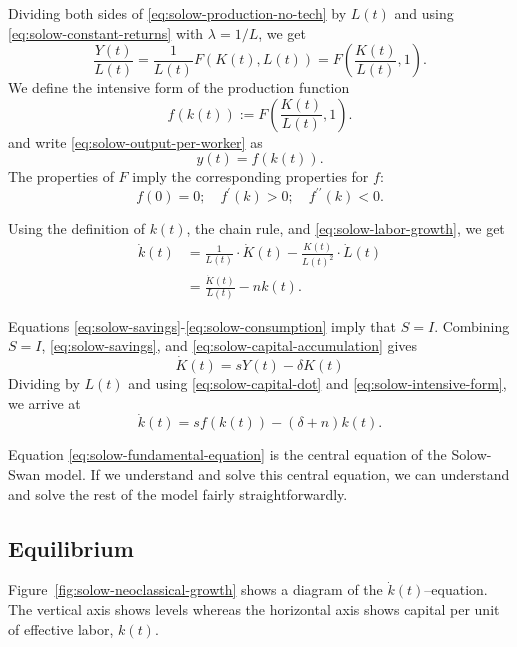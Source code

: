 \documentclass[\topdir/lecture\_notes.tex]{subfiles}
\begin{document}
Dividing both sides of \eqref{eq:solow-production-no-tech} by $L(t)$ and using \eqref{eq:solow-constant-returns} with $\lambda = 1/L$, we get
\begin{equation}
  \frac{Y(t)}{L(t)} = \frac{1}{L(t)} F(K(t), L(t)) = F \left(\frac{K(t)}{L(t)}, 1\right). \label{eq:solow-output-per-worker}
\end{equation}
We define the intensive form of the production function
\begin{equation}
  f(k(t)) := F \left(\frac{K(t)}{L(t)}, 1\right). \label{eq:solow-intensive-production}
\end{equation}
and write \eqref{eq:solow-output-per-worker} as
\begin{equation}
  y(t) = f(k(t)). \label{eq:solow-intensive-form}
\end{equation}
The properties of $F$ imply the corresponding properties for $f$:
\begin{equation}
  f(0)=0 ; \quad f^{\prime}(k)>0 ; \quad f^{\prime \prime}(k)<0.
\end{equation}

Using the definition of $k(t)$, the chain rule, and \eqref{eq:solow-labor-growth}, we get
\begin{align}
\dot{k}(t) & = \frac{1}{L(t)} \cdot \dot{K}(t)-\frac{K(t)}{L(t)^{2}} \cdot \dot{L}(t) \\
           & =\frac{\dot{K}(t)}{L(t)}-n k(t).
           \label{eq:solow-k-dot-derivation}
\end{align}

Equations \eqref{eq:solow-savings}-\eqref{eq:solow-consumption} imply that $S=I$.
Combining $S=I$, \eqref{eq:solow-savings}, and \eqref{eq:solow-capital-accumulation} gives
\begin{equation}
  \dot{K}(t)=s Y(t)-\delta K(t) \label{eq:solow-capital-dot}
\end{equation}
Dividing by $L(t)$ and using \eqref{eq:solow-capital-dot} and \eqref{eq:solow-intensive-form}, we arrive at
\begin{equation}
  \dot{k}(t)=s f(k(t))-\left(\delta+n\right) k(t). \label{eq:solow-fundamental-equation}
\end{equation}

Equation \eqref{eq:solow-fundamental-equation} is the central equation of the Solow-Swan model.
If we understand and solve this central equation, we can understand and solve the rest of the model fairly straightforwardly.

\subsection{Equilibrium}
Figure~\ref{fig:solow-neoclassical-growth} shows a diagram of the $\dot{k}(t)$--equation.
The vertical axis shows levels whereas the horizontal axis shows capital per unit of effective labor, $k(t)$.
\end{document}
